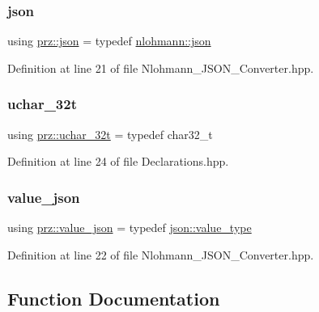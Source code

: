\subsubsection{\texorpdfstring{json}{json}}
{\footnotesize\ttfamily using \mbox{\hyperlink{namespaceprz_a2d8e9eeb62cf098759f1fff869da67f7}{prz\+::json}} = typedef \mbox{\hyperlink{namespacenlohmann_a2bfd99e845a2e5cd90aeaf1b1431f474}{nlohmann\+::json}}}



Definition at line 21 of file Nlohmann\+\_\+\+J\+S\+O\+N\+\_\+\+Converter.\+hpp.

\mbox{\label{namespaceprz_a900326d968b998836015a7d742cc941c}} 
\subsubsection{\texorpdfstring{uchar\_32t}{uchar\_32t}}
{\footnotesize\ttfamily using \mbox{\hyperlink{namespaceprz_a900326d968b998836015a7d742cc941c}{prz\+::uchar\+\_\+32t}} = typedef char32\+\_\+t}



Definition at line 24 of file Declarations.\+hpp.

\mbox{\label{namespaceprz_a8dc8c96e6ba58afc2c8089b94234c74f}} 
\subsubsection{\texorpdfstring{value\_json}{value\_json}}
{\footnotesize\ttfamily using \mbox{\hyperlink{namespaceprz_a8dc8c96e6ba58afc2c8089b94234c74f}{prz\+::value\+\_\+json}} = typedef \mbox{\hyperlink{classnlohmann_1_1basic__json_a2b3297873b70c080837e8eedc4fec32f}{json\+::value\+\_\+type}}}



Definition at line 22 of file Nlohmann\+\_\+\+J\+S\+O\+N\+\_\+\+Converter.\+hpp.



\subsection{Function Documentation}
\mbox{\label{namespaceprz_adf1775cc377a8c1a6b92ba0e648d98f1}} 
